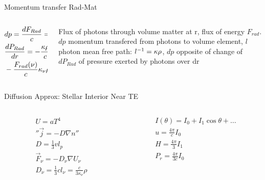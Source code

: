 \begin{frame}{Momentum transfer Rad-Mat}
    \begin{columns}[T]
        \begin{column}{0.6\textwidth}
    \begin{align*}
        &dp=\frac{dF_{Rad}}{c}=\frac{F_{Rad}}{c}\frac{dr}{l}\\
        &\TDy{r}{P_{Rad}}=-\frac{\kappa\rho}{c}F_{Rad}\\
        &-\frac{F_{rad}(\nu)}{c}\kappa_{\nu}\rho\,dr=\frac{4\pi}{3c}\TDy{r}{B_{\nu}(T)}\,dr\tag{L-grad T}
    \end{align*}
        \end{column}
        \begin{column}{0.4\textwidth}
            Flux of photons through volume matter at r, flux of energy $F_{rad}$. $dp$ momentum transfered from photons to volume element, $l$ photon mean free path: $\invers{l}=\kappa\rho$, $dp$ opposite of change of $dP_{Rad}$ of pressure exerted by photons over dr
        \end{column}
    \end{columns}
\end{frame}

\begin{frame}{Diffusion Approx: Stellar Interior Near TE}
    \begin{columns}[T]
        \begin{column}{0.5\textwidth}
    \begin{align*}
                &U=aT^4\\
                &''\vec{j}=-D\nabla n''\tag{diffusion}\\
                &D=\frac{1}{3}vl_p\\
                &\vec{F}_{\nu}=-D_{\nu}\nabla U_{\nu}\\
                &D_{\nu}=\frac{1}{3}cl_{\nu}=\frac{c}{3\kappa_{\nu}}\rho
            \end{align*}
        \end{column}
        \begin{column}{0.5\textwidth}
            \begin{align*}
                &I(\theta)=I_0+I_1\cos{\theta}+\ldots\\
                &u=\frac{4\pi}{c}I_0\\
                &H=\frac{4\pi}{3}I_1\\
                &P_r=\frac{4\pi}{3c}I_0
            \end{align*}
        \end{column}
    \end{columns}
    \end{frame}

